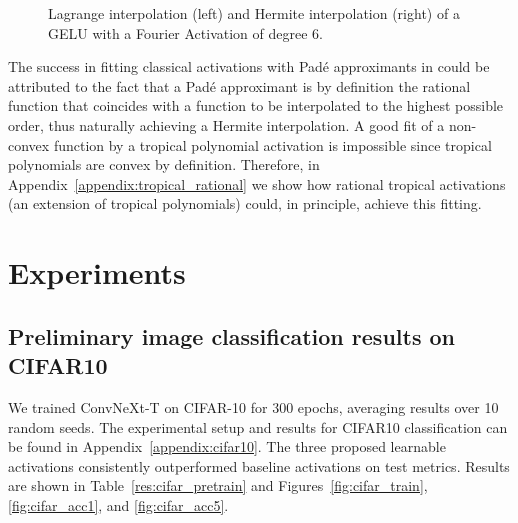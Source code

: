 \documentclass{article} %
\theoremstyle{plain}
\theoremstyle{definition}
\theoremstyle{remark}
\begin{document}
\begin{figure}[!htbp]
\begin{minipage}{0.48\textwidth}

    \end{minipage}
    \caption{Lagrange interpolation (left) and Hermite interpolation (right) of a GELU with a Fourier Activation of degree 6.}
    \label{fig:gelu_vs_fourier}
\end{figure}

The success in fitting classical activations with Padé approximants in \cite{yang2025kolmogorovarnold} could be attributed to the fact that a Padé approximant is by definition the rational function  that coincides with a function to be interpolated to the highest possible order, thus naturally achieving a Hermite interpolation. A good fit of a non-convex function by a tropical polynomial activation is impossible since tropical polynomials are convex by definition. Therefore, in Appendix~\ref{appendix:tropical_rational} we show how rational tropical activations (an extension of tropical polynomials) could, in principle, achieve this fitting.

\section{Experiments}
\subsection{Preliminary image classification results on CIFAR10}
We trained ConvNeXt-T \citep{liu2022convnet} on CIFAR-10 \citep{krizhevsky2009learning} for 300 epochs, averaging results over 10 random seeds. The experimental setup and results for CIFAR10 classification can be found in Appendix~\ref{appendix:cifar10}. The three proposed learnable activations consistently outperformed baseline activations on test metrics. Results are shown in Table~\ref{res:cifar_pretrain} and Figures~\ref{fig:cifar_train}, \ref{fig:cifar_acc1}, and \ref{fig:cifar_acc5}.
\end{document}
